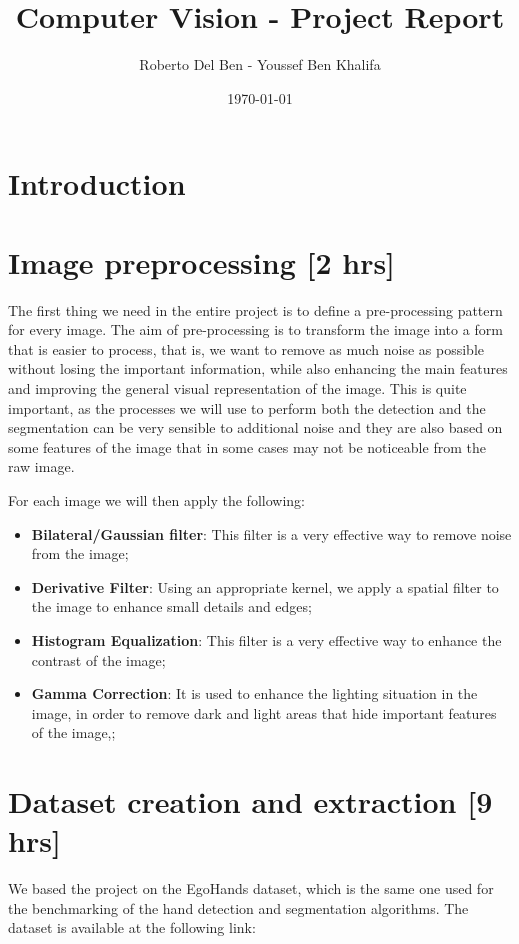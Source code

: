 
\title{Computer Vision - Project Report}
\author{Roberto Del Ben - Youssef Ben Khalifa}
\date{\today}

\maketitle \tableofcontents
\newpage

\section{Introduction}

\section{Image preprocessing [2 hrs]}

The first thing we need in the entire project is to define a pre-processing pattern for every image. The aim of pre-processing is to transform the image into a form 
that is easier to process, that is, we want to remove as much noise as possible without losing the important information, while also enhancing the main features and 
improving the general visual representation of the image. This is quite important, as the processes we will use to perform both the detection and the segmentation 
can be very sensible to additional noise and they are also based on some features of the image that in some cases may not be noticeable from the raw image.

For each image we will then apply the following:
\begin{itemize}
    \item \textbf{Bilateral/Gaussian filter}: This filter is a very effective way to remove noise from the image;
    \item \textbf{Derivative Filter}: Using an appropriate kernel, we apply a spatial filter to the image to enhance small details and edges;
    \item \textbf{Histogram Equalization}: This filter is a very effective way to enhance the contrast of the image;
    \item \textbf{Gamma Correction}: It is used to enhance the lighting situation in the image, in order to remove dark and light areas that hide important features of the image,;
\end{itemize}

\section{Dataset creation and extraction [9 hrs]}
We based the project on the EgoHands dataset, which is the same one used for the benchmarking of the hand detection and segmentation algorithms. The dataset is available at the following link:

